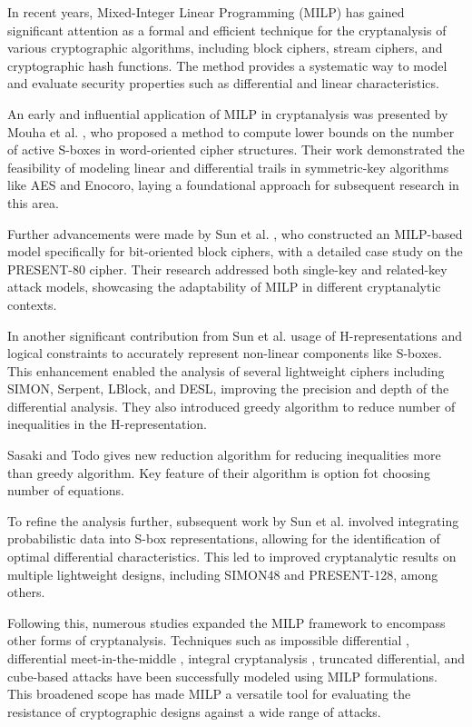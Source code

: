 In recent years, Mixed-Integer Linear Programming (MILP) has gained significant attention as a formal and efficient technique for the cryptanalysis of various cryptographic algorithms, including block ciphers, stream ciphers, and cryptographic hash functions. The method provides a systematic way to model and evaluate security properties such as differential and linear characteristics.

An early and influential application of MILP in cryptanalysis was presented by Mouha et al. \cite{mouha2012differential}, who proposed a method to compute lower bounds on the number of active S-boxes in word-oriented cipher structures. Their work demonstrated the feasibility of modeling linear and differential trails in symmetric-key algorithms like AES and Enocoro, laying a foundational approach for subsequent research in this area.

Further advancements were made by Sun et al. \cite{sun2013automatic}, who constructed an MILP-based model specifically for bit-oriented block ciphers, with a detailed case study on the PRESENT-80 cipher. Their research addressed both single-key and related-key attack models, showcasing the adaptability of MILP in different cryptanalytic contexts. 

In another significant contribution from Sun et al. \cite{sun2014automatic} usage of H-representations and logical constraints to accurately represent non-linear components like S-boxes. This enhancement enabled the analysis of several lightweight ciphers including SIMON, Serpent, LBlock, and DESL, improving the precision and depth of the differential analysis. They also introduced greedy algorithm to reduce number of inequalities in the H-representation.

Sasaki and Todo \cite{sasaki2017new} gives new reduction algorithm for reducing inequalities more than greedy algorithm. Key feature of their algorithm is option fot choosing number of equations.

To refine the analysis further, subsequent work by Sun et al. \cite{sun2014towards} involved integrating probabilistic data into S-box representations, allowing for the identification of optimal differential characteristics. This led to improved cryptanalytic results on multiple lightweight designs, including SIMON48 and PRESENT-128, among others.

Following this, numerous studies expanded the MILP framework to encompass other forms of cryptanalysis. Techniques such as impossible differential \cite{liu2023novel}, differential meet-in-the-middle \cite{ahmadian2024improved}, integral cryptanalysis \cite{mirzaie2023integral}, truncated differential,\cite{ebrahimi2020new}  and cube-based attacks \cite{song2018cube} have been successfully modeled using MILP formulations. This broadened scope has made MILP a versatile tool for evaluating the resistance of cryptographic designs against a wide range of attacks.

